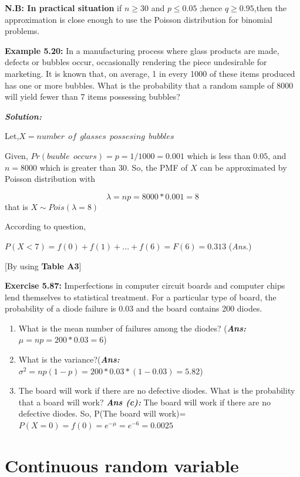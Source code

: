 \documentclass[
]{article}
\providecommand{\tightlist}{%
  \setlength{\itemsep}{0pt}\setlength{\parskip}{0pt}}
\begin{document}
\textbf{N.B: In practical situation} if \(n \ge 30\) and \(p\le 0.05\) ;hence \(q\ge 0.95\),then the approximation is close enough to use the Poisson distribution for binomial problems\citep{baron_probability_2019}.

\textbf{Example 5.20:}\citep{walpole_probability_2017} In a manufacturing process where glass products are made, defects or bubbles occur, occasionally rendering the piece undesirable for marketing. It is known that, on average, 1 in every 1000 of these items produced has one or more bubbles. What is the probability that a random sample of 8000 will yield fewer than 7 items possessing bubbles?

\textbf{\emph{Solution:}}

Let,\(X=number\ \ of \ \ glasses\ \ possesing\ \ bubbles\)

Given, \(Pr(buuble \ \ occurs)=p=1/1000=0.001\) which is less than \(0.05\), and \(n=8000\) which is greater than \(30\). So, the PMF of \(X\) can be approximated by Poisson distribution with

\[\lambda =np=8000*0.001=8\] that is \(X\sim Pois (\lambda=8)\)

According to question,

\(P(X<7)=f(0)+f(1)+...+f(6)=F(6)=0.313\) (\emph{Ans.})

{[}By using \textbf{Table A3}{]}

\textbf{Exercise 5.87:}\citep{walpole_probability_2017} Imperfections in computer circuit boards and computer chips lend themselves to statistical treatment. For a particular type of board, the probability of a diode failure is 0.03 and the board contains 200 diodes.

\begin{enumerate}
\def\labelenumi{(\alph{enumi})}
\tightlist
\item
  What is the mean number of failures among the diodes? (\textbf{\emph{Ans:}} \(\mu=np=200*0.03=6\))
\item
  What is the variance?(\textbf{\emph{Ans:}} \(\sigma^2=np(1-p)=200*0.03*(1-0.03)=5.82\))
\item
  The board will work if there are no defective diodes. What is the probability that a board will work? \textbf{\emph{Ans (c):}} The board will work if there are no defective diodes. So, P(The board will work)=\(P(X=0)=f(0)=e^{-\mu}=e^{-6}=0.0025\)
\end{enumerate}

\section{Continuous random variable}\label{continuous-random-variable}
\end{document}
